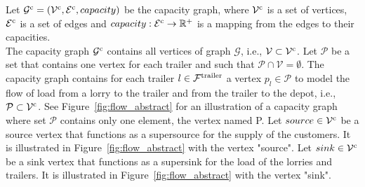 Let
$\mathcal G^{\rm c} = ( \mathcal V^{\rm c},\mathcal E^{\rm c}, capacity)$
be the capacity graph, where
$\mathcal V^{\rm c}$
is a set of vertices,
$\mathcal E^{\rm c}$
is a set of edges
and
$capacity : \mathcal E^{\rm c} \rightarrow \mathbb{R}^+ $
is a mapping from the edges to their capacities.\\

The capacity graph $\mathcal G^{\rm c}$ contains all vertices of graph $\mathcal G$, i.e., $  \mathcal V \subset \mathcal V^{\rm c}$.
%
Let $\mathcal P$  be a set that contains one vertex for each trailer and such that $\mathcal P \cap \mathcal V = \emptyset $.
The capacity graph contains
for each trailer
$l \in \mathcal F^{\rm trailer} $
a vertex
$p_l \in \mathcal P $
to model the flow of load from a lorry to the trailer and from the trailer to the depot, i.e., $  \mathcal P \subset \mathcal V^{\rm c}$.
See Figure~\ref{fig:flow_abstract} for an illustration of a capacity graph where set $\mathcal P$ contains only one element, the vertex named  P.
%
Let $source \in \mathcal V^{\rm c} $ be a source vertex that functions as a supersource for the supply of the customers.
It is illustrated in  Figure~\ref{fig:flow_abstract} with the vertex "source".
Let $sink \in \mathcal V^{\rm c}$ be a sink vertex that functions as a supersink for  the load of the lorries and trailers.
 It is illustrated in  Figure~\ref{fig:flow_abstract} with the vertex "sink". \\





